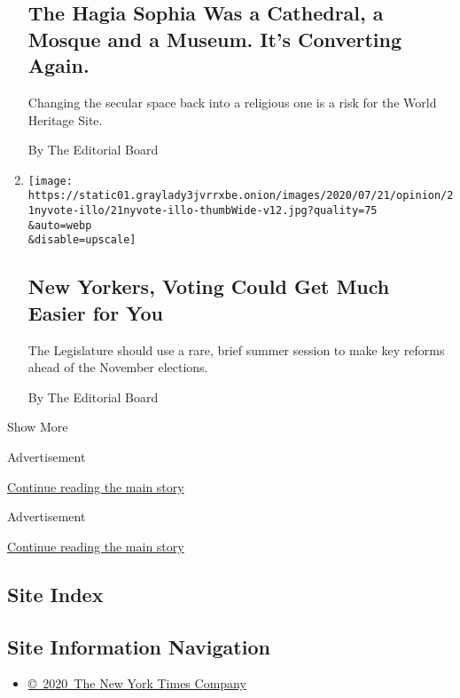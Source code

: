 \begin{enumerate}
{  \subsection{The Hagia Sophia Was a Cathedral, a Mosque and a Museum.
  It's Converting
  Again.}\label{the-hagia-sophia-was-a-cathedral-a-mosque-and-a-museum-its-converting-again}}

  Changing the secular space back into a religious one is a risk for the
  World Heritage Site.

  By The Editorial Board
\item
  \href{/2020/07/21/opinion/new-york-vote.html}{}

  \texttt{[image: https://static01.graylady3jvrrxbe.onion/images/2020/07/21/opinion/21nyvote-illo/21nyvote-illo-thumbWide-v12.jpg?quality=75\\\&auto=webp\\\&disable=upscale]}

  \hypertarget{new-yorkers-voting-could-get-much-easier-for-you}{%
  \subsection{New Yorkers, Voting Could Get Much Easier for
  You}\label{new-yorkers-voting-could-get-much-easier-for-you}}

  The Legislature should use a rare, brief summer session to make key
  reforms ahead of the November elections.

  By The Editorial Board
\end{enumerate}

Show More

Advertisement

\protect\hyperlink{after-mid1}{Continue reading the main story}

Advertisement

\protect\hyperlink{after-mktg}{Continue reading the main story}

\hypertarget{site-index}{%
\subsection{Site Index}\label{site-index}}

\hypertarget{site-information-navigation}{%
\subsection{Site Information
Navigation}\label{site-information-navigation}}

\begin{itemize}
\tightlist
\item
  \href{https://help.nytimes3xbfgragh.onion/hc/en-us/articles/115014792127-Copyright-notice}{©~2020~The
  New York Times Company}
\end{itemize}

